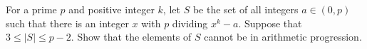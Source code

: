 For a prime $p$ and positive integer $k$, let $S$ be the set of all integers $a\in\left(0,p\right)$ such that there is an integer $x$ with $p$ dividing $x^k-a$. Suppose that $3\leq\left|S\right|\leq p-2$. Show that the elements of $S$ cannot be in arithmetic progression.
